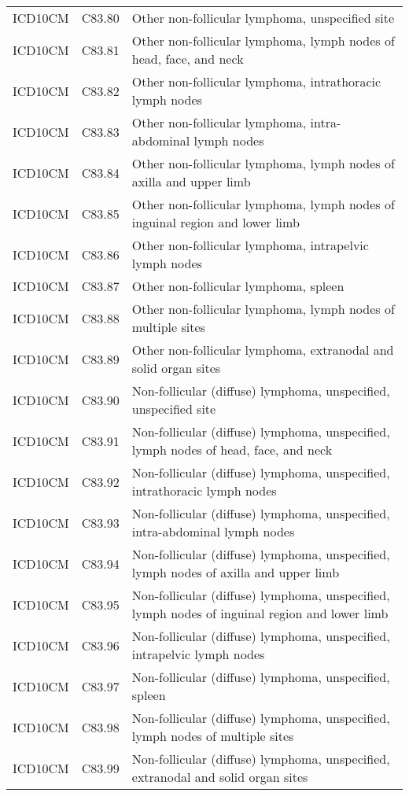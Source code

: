 \begin{longtable}{p{}p{}p{}}
  ICD10CM & C83.80 & Other non-follicular lymphoma, unspecified site \\ 
  ICD10CM & C83.81 & Other non-follicular lymphoma, lymph nodes of head, face, and neck \\ 
  ICD10CM & C83.82 & Other non-follicular lymphoma, intrathoracic lymph nodes \\ 
  ICD10CM & C83.83 & Other non-follicular lymphoma, intra-abdominal lymph nodes \\ 
  ICD10CM & C83.84 & Other non-follicular lymphoma, lymph nodes of axilla and upper limb \\ 
  ICD10CM & C83.85 & Other non-follicular lymphoma, lymph nodes of inguinal region and lower limb \\ 
  ICD10CM & C83.86 & Other non-follicular lymphoma, intrapelvic lymph nodes \\ 
  ICD10CM & C83.87 & Other non-follicular lymphoma, spleen \\ 
  ICD10CM & C83.88 & Other non-follicular lymphoma, lymph nodes of multiple sites \\ 
  ICD10CM & C83.89 & Other non-follicular lymphoma, extranodal and solid organ sites \\ 
  ICD10CM & C83.90 & Non-follicular (diffuse) lymphoma, unspecified, unspecified site \\ 
  ICD10CM & C83.91 & Non-follicular (diffuse) lymphoma, unspecified, lymph nodes of head, face, and neck \\ 
  ICD10CM & C83.92 & Non-follicular (diffuse) lymphoma, unspecified, intrathoracic lymph nodes \\ 
  ICD10CM & C83.93 & Non-follicular (diffuse) lymphoma, unspecified, intra-abdominal lymph nodes \\ 
  ICD10CM & C83.94 & Non-follicular (diffuse) lymphoma, unspecified, lymph nodes of axilla and upper limb \\ 
  ICD10CM & C83.95 & Non-follicular (diffuse) lymphoma, unspecified, lymph nodes of inguinal region and lower limb \\ 
  ICD10CM & C83.96 & Non-follicular (diffuse) lymphoma, unspecified, intrapelvic lymph nodes \\ 
  ICD10CM & C83.97 & Non-follicular (diffuse) lymphoma, unspecified, spleen \\ 
  ICD10CM & C83.98 & Non-follicular (diffuse) lymphoma, unspecified, lymph nodes of multiple sites \\ 
  ICD10CM & C83.99 & Non-follicular (diffuse) lymphoma, unspecified, extranodal and solid organ sites \\ 

\end{longtable}
